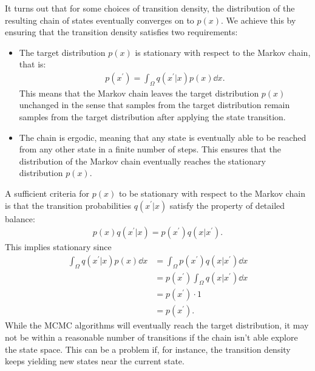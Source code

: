 It turns out that for some choices of transition density, the distribution of the resulting chain of states eventually converges on to $p(x)$.
We achieve this by ensuring that the transition density satisfies two requirements:

\begin{itemize}
    \item The target distribution $p(x)$ is stationary with respect to the Markov chain, that is:
    \begin{align} \label{eq:stationarity}
        p(x^\prime) = \int_{\Omega} q(x^\prime| x) p(x) \dd{x}.
    \end{align}
    This means that the Markov chain leaves the target  distribution $p(x)$ unchanged in the sense that samples from the target distribution remain samples from the target distribution after applying the state transition.
    
    \item The chain is ergodic, meaning that any state is eventually able to be reached from any other state in a finite number of steps.
    This ensures that the distribution of the Markov chain eventually reaches the stationary distribution $p(x)$.
    
\end{itemize}
A sufficient criteria for $p(x)$ to be stationary with respect to the Markov chain is that the transition probabilities $q(x^\prime|x)$ satisfy the property of detailed balance:
\begin{align} \label{eq:detailed-balance}
    p(x)q(x^\prime | x) = p(x^\prime)q(x| x^\prime).
\end{align}
This implies stationary since
\begin{align}    
    \int_{\Omega} q(x^\prime | x) p(x) \dd{x} 
    &= \int_{\Omega}  p(x^\prime)q(x| x^\prime) \dd{x} \\ 
    &=  p(x^\prime) \int_{\Omega} q(x| x^\prime) \dd{x} \\
    &=  p(x^\prime) \cdot 1 \\
    &= p(x^\prime).
\end{align}
While the MCMC algorithms will eventually reach the target distribution, it may not be within a reasonable number of transitions if the chain isn't able explore the state space.
This can be a problem if, for instance, the transition density keeps yielding new states near the current state.  

